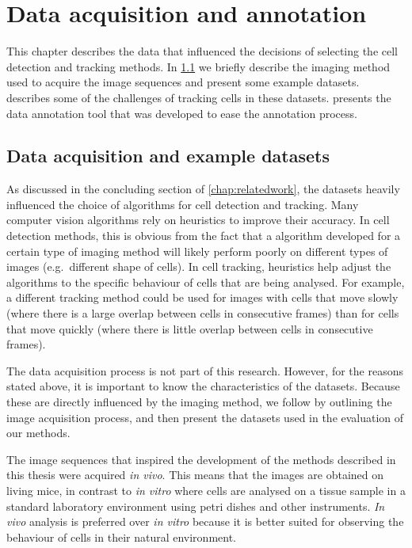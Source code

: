 \chapter{Data acquisition and annotation}
	\label{chap:data}
	
	This chapter describes the data that influenced the decisions of selecting the cell detection and tracking methods. In \cref{sec:data_examples} we briefly describe the imaging method used to acquire the image sequences and present some example datasets.  describes some of the challenges of tracking cells in these datasets.  presents the data annotation tool that was developed to ease the annotation process.

    \section{Data acquisition and example datasets}
    \label{sec:data_examples}
    
    As discussed in the concluding section of \cref{chap:relatedwork}, the datasets heavily influenced the choice of algorithms for cell detection and tracking. Many computer vision algorithms rely on heuristics to improve their accuracy. In cell detection methods, this is obvious from the fact that a algorithm developed for a certain type of imaging method will likely perform poorly on different types of images (e.g.\ different shape of cells). In cell tracking, heuristics help adjust the algorithms to the specific behaviour of cells that are being analysed. For example, a different tracking method could be used for images with cells that move slowly (where there is a large overlap between cells in consecutive frames) than for cells that move quickly (where there is little overlap between cells in consecutive frames).
    
    The data acquisition process is not part of this research. However, for the reasons stated above, it is important to know the characteristics of the datasets. Because these are directly influenced by the imaging method, we follow by outlining the image acquisition process, and then present the datasets used in the evaluation of our methods.
    
    The image sequences that inspired the development of the methods described in this thesis were acquired \textit{in vivo}. This means that the images are obtained on living mice, in contrast to \textit{in vitro} where cells are analysed on a tissue sample in a standard laboratory environment using petri dishes and other instruments. \textit{In vivo} analysis is preferred over \textit{in vitro} because it is better suited for observing the behaviour of cells in their natural environment.
    
